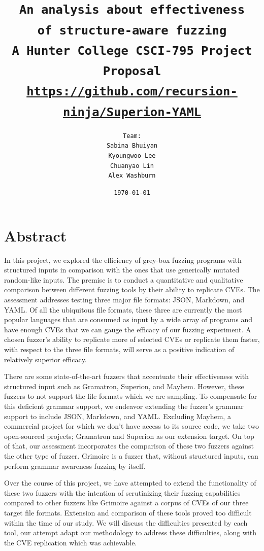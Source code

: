 \documentclass[12pt]{diazessay}
\title{\texttt{\huge{An analysis about effectiveness\\\vspace{-3mm}of structure-aware fuzzing} \\\vspace{-0.35cm} {\large A Hunter College CSCI-795 Project Proposal}\\\normalsize\url{https://github.com/recursion-ninja/Superion-YAML}}} %
\author{\texttt{{\Huge Team:}\\\vspace*{-0.5em} 
		Sabina Bhuiyan \\\vspace*{-0.5em} 
		Kyoungwoo Lee \\\vspace*{-0.5em}
		Chuanyao Lin \\\vspace*{-0.25em}
		Alex Washburn}} %
\date{\texttt{\today}} %
\begin{document}
\maketitle %

\vspace{1cm}
\section*{Abstract}


In this project, we explored the efficiency of grey-box fuzzing programs with structured inputs in comparison with the ones that use generically mutated random-like inputs.
The premise is to conduct a quantitative and qualitative comparison between different fuzzing tools by their ability to replicate CVEs.
The assessment addresses testing three major file formats: JSON, Markdown, and YAML.
Of all the ubiquitous file formats, these three are currently the most popular languages that are consumed as input by a wide array of programs and have enough CVEs that we can gauge the efficacy of our fuzzing experiment.
A chosen fuzzer's ability to replicate more of selected CVEs or replicate them faster, with respect to the three file formats, will serve as a positive indication of relatively superior efficacy.

There are some state-of-the-art fuzzers that accentuate their effectiveness with structured input such as Gramatron, Superion, and Mayhem.
However, these fuzzers to not support the file formats which we are sampling.
To compensate for this deficient grammar support, we endeavor extending the fuzzer's grammar support to include JSON, Markdown, and YAML.
Excluding Mayhem, a commercial project for which we don't have access to its source code, we take two open-sourced projects; Gramatron and Superion as our extension target.
On top of that, our assessment incorporates the comparison of these two fuzzers against the other type of fuzzer.
Grimoire is a fuzzer that, without structured inputs, can perform grammar awareness fuzzing by itself.

Over the course of this project, we have attempted to extend the functionality of these two fuzzers with the intention of scrutinizing their fuzzing capabilities compared to other fuzzers like Grimoire against a corpus of CVEs of our three target file formats.
Extension and comparison of these tools proved too difficult within the time of our study.
We will discuss the difficulties presented by each tool, our attempt adapt our methodology to address these difficulties, along with the CVE replication which was achievable.
\end{document}
